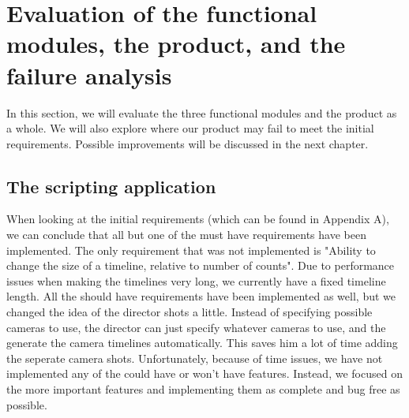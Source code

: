 \section{Evaluation of the functional modules, the product, and the failure analysis}

In this section, we will evaluate the three functional modules and the product as a whole. We will also explore where our product may fail to meet the initial requirements. Possible improvements will be discussed in the next chapter.\\

\subsection*{The scripting application}
When looking at the initial requirements (which can be found in Appendix A), we can conclude that all but one of the must have requirements have been implemented. The only requirement that was not implemented is "Ability to change the size of a timeline, relative to number of counts". Due to performance issues when making the timelines very long, we currently have a fixed timeline length. All the should have requirements have been implemented as well, but we changed the idea of the director shots a little. Instead of specifying possible cameras to use, the director can just specify whatever cameras to use, and the generate the camera timelines automatically. This saves him a lot of time adding the seperate camera shots. Unfortunately, because of time issues, we have not implemented any of the could have or won't have features. Instead, we focused on the more important features and implementing them as complete and bug free as possible.

